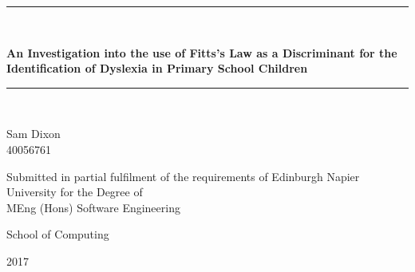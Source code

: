 \newcommand{\HRule}{\rule{\linewidth}{0.5mm}}

\begin{titlepage}
	\begin{center}
		\HRule \\[0.4cm]
	   	{\Large \bfseries An Investigation into the use of Fitts's Law as a Discriminant for the Identification of Dyslexia in Primary School Children\par}
		\vspace{0.2cm}
		\HRule \\[1.5cm]
	   	\vspace{3cm}
		
		\begin{minipage}{0.4\textwidth}
			\begin{center}
				\large
				Sam Dixon 
				\\ 40056761		
		   	\end{center}
	    \end{minipage}
		
		\vspace{2cm}
		
	   	\begin{minipage}{1\textwidth}
	    	\begin{center} \large
				Submitted in partial fulfilment of the requirements of Edinburgh Napier University for the Degree of \\ MEng (Hons) Software Engineering
	    	\end{center}
	   	\end{minipage}
	
	   	\vfill
	
		\begin{minipage}{1\textwidth}
	    	\begin{center} \large
				School of Computing
	    	\end{center}
	   	\end{minipage}
   	
		\vspace{1cm}
	    {\large 2017}

	\end{center}
\end{titlepage}